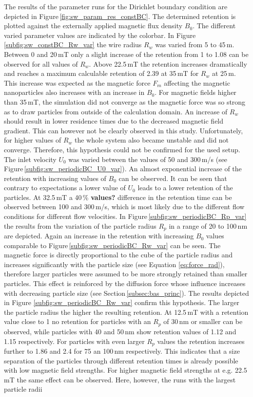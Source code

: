 The results of the parameter runs for the Dirichlet boundary condition are depicted in Figure\,\ref{fig:sw_param_res_constBC}. The determined retention is plotted against the externally applied magnetic flux density $B_{0}$. The different varied parameter values are indicated by the colorbar. In Figure\, \ref{subfig:sw_constBC_Rw_var} the wire radius $R_{w}$ was varied from 5 to 45\,\textmu m. Between 0 and 20\,mT only a slight increase of the retention from 1 to 1.08 can be observed for all values of $R_{w}$. Above 22.5\,mT the retention increases dramatically and reaches a maximum calculable retention of 2.39 at 35\,mT for $R_{w}$ at 25\,\textmu m. This increase was expected as the magnetic force $F_{m}$    
affecting the magnetic nanoparticles also increases with an increase in $B_{0}$. For magnetic fields higher than 35\,mT, the simulation did not converge as the magnetic force was so strong as to draw particles from outside of the calculation domain. An increase of $R_{w}$ should result in lower residence times due to the decreased magnetic field gradient. This can however not be clearly observed in this study. Unfortunately, for higher values of $R_{w}$ the whole system also became unstable and did not converge. Therefore, this hypothesis could not be confirmed for the used setup. The inlet velocity $U_{0}$ was varied between the values of 50 and 300\,\textmu m/s (see Figure\,\ref{subfig:sw_periodicBC_U0_var}). An almost exponential increase of the retention with increasing values of $B_{0}$ can be observed. It can be seen that contrary to expectations a lower value of $U_{0}$ leads to a lower retention of the particles. At 32.5\,mT a 40\,\% \textbf{values?} difference in the retention time can be observed between 100 and 300\,\textmu m/s, which is most likely due to the different flow conditions for different flow velocities. In Figure\,\ref{subfig:sw_periodicBC_Rp_var} the results from the variation of the particle radius $R_{p}$ in a range of 20 to 100\,nm are depicted. Again an increase in the retention with increasing $B_{0}$ values comparable to Figure\,\ref{subfig:sw_periodicBC_Rw_var} can be seen. The magnetic force is directly proportional to the cube of the particle radius and increases significantly with the particle size (see Equation \ref{eq:force_rad}), therefore larger particles were assumed to be more strongly retained than smaller particles. This effect is reinforced by the diffusion force whose influence increases with decreasing particle size (see Section\,\ref{subsec:bas_princ}). The results depicted in Figure \ref{subfig:sw_periodicBC_Rw_var} confirm this hypothesis. The larger the particle radius the higher the resulting retention. At 12.5\,mT with a retention value close to 1 no retention for particles with an $R_{p}$ of 30\,nm or smaller can be observed, while particles with 40 and 50\,nm show retention values of 1.12 and 1.15 respectively. For particles with even larger $R_{p}$ values the retention increases further to 1.86 and 2.4 for 75 an 100\,nm respectively. This indicates that a size separation of the particles through different retention times is already possible with low magnetic field strengths. For higher magnetic field strengths at e.g. 22.5\,mT the same effect can be observed. Here, however, the runs with the largest particle radii 